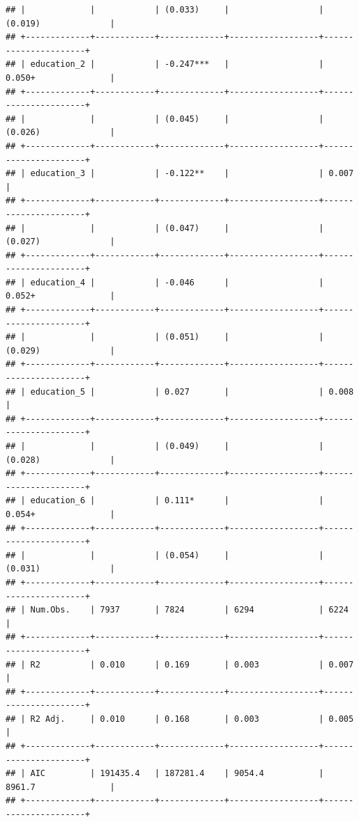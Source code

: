 \documentclass[
]{article}
\begin{document}
\begin{verbatim}
## |             |            | (0.033)     |                  | (0.019)              |
## +-------------+------------+-------------+------------------+----------------------+
## | education_2 |            | -0.247***   |                  | 0.050+               |
## +-------------+------------+-------------+------------------+----------------------+
## |             |            | (0.045)     |                  | (0.026)              |
## +-------------+------------+-------------+------------------+----------------------+
## | education_3 |            | -0.122**    |                  | 0.007                |
## +-------------+------------+-------------+------------------+----------------------+
## |             |            | (0.047)     |                  | (0.027)              |
## +-------------+------------+-------------+------------------+----------------------+
## | education_4 |            | -0.046      |                  | 0.052+               |
## +-------------+------------+-------------+------------------+----------------------+
## |             |            | (0.051)     |                  | (0.029)              |
## +-------------+------------+-------------+------------------+----------------------+
## | education_5 |            | 0.027       |                  | 0.008                |
## +-------------+------------+-------------+------------------+----------------------+
## |             |            | (0.049)     |                  | (0.028)              |
## +-------------+------------+-------------+------------------+----------------------+
## | education_6 |            | 0.111*      |                  | 0.054+               |
## +-------------+------------+-------------+------------------+----------------------+
## |             |            | (0.054)     |                  | (0.031)              |
## +-------------+------------+-------------+------------------+----------------------+
## | Num.Obs.    | 7937       | 7824        | 6294             | 6224                 |
## +-------------+------------+-------------+------------------+----------------------+
## | R2          | 0.010      | 0.169       | 0.003            | 0.007                |
## +-------------+------------+-------------+------------------+----------------------+
## | R2 Adj.     | 0.010      | 0.168       | 0.003            | 0.005                |
## +-------------+------------+-------------+------------------+----------------------+
## | AIC         | 191435.4   | 187281.4    | 9054.4           | 8961.7               |
## +-------------+------------+-------------+------------------+----------------------+

\end{verbatim}
\end{document}
